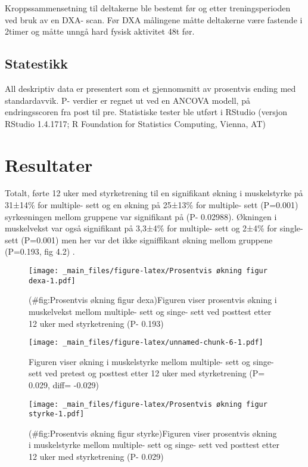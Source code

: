\documentclass[
]{book}
\begin{document}
Kroppssammensetning til deltakerne ble bestemt før og etter treningsperioden ved bruk av en DXA- scan. Før DXA målingene måtte deltakerne være fastende i 2timer og måtte unngå hard fysisk aktivitet 48t før. ~

\hypertarget{statestikk}{%
\subsection{Statestikk}\label{statestikk}}

All deskriptiv data er presentert som et gjennomsnitt av prosentvis ending med standardavvik. P- verdier er regnet ut ved en ANCOVA modell, på endringsscoren fra post til pre. Statistiske tester ble utført i RStudio (versjon RStudio 1.4.1717; R Foundation for Statistics Computing, Vienna, AT)

\hypertarget{resultater}{%
\section{Resultater}\label{resultater}}

Totalt, førte 12 uker med styrketrening til en signifikant økning i muskelstyrke på 31±14\% for multiple- sett og en økning på 25±13\% for multiple- sett (P=0.001) syrkeøningen mellom gruppene var signifikant på (P- 0.02988). Økningen i muskelvekst var også signifikant på 3,3±4\% for multiple- sett og 2±4\% for single- sett (P=0.001) men her var det ikke signiffikant økning mellom gruppene (P=0.193, fig 4.2) .

\begin{figure}
\centering
\texttt{[image: \_main\_files/figure-latex/Prosentvis økning figur dexa-1.pdf]}
\caption{(\#fig:Prosentvis økning figur dexa)Figuren viser prosentvis økning i muskelvekst mellom multiple- sett og singe- sett ved posttest etter 12 uker med styrketrening (P- 0.193)}
\end{figure}

\begin{figure}
\centering
\texttt{[image: \_main\_files/figure-latex/unnamed-chunk-6-1.pdf]}
\caption{\label{fig:unnamed-chunk-6}Figuren viser økning i muskelstyrke mellom multiple- sett og singe- sett ved pretest og posttest etter 12 uker med styrketrening (P= 0.029, diff= -0.029)}
\end{figure}

\begin{figure}
\centering
\texttt{[image: \_main\_files/figure-latex/Prosentvis økning figur styrke-1.pdf]}
\caption{(\#fig:Prosentvis økning figur styrke)Figuren viser prosentvis økning i muskelstyrke mellom multiple- sett og singe- sett ved posttest etter 12 uker med styrketrening (P- 0.029)}
\end{figure}
\end{document}
